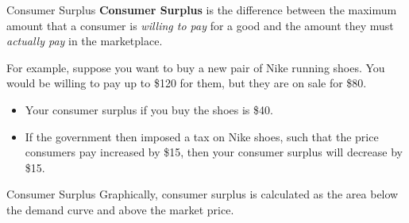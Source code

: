 \documentclass{beamer}
\begin{document}
\begin{frame}{Consumer Surplus}
  \textbf{Consumer Surplus} is the difference between the maximum amount that a consumer is \emph{willing to pay} for a good and the amount they must \emph{actually pay} in the marketplace.
  

  \bigskip
  For example, suppose you want to buy a new pair of Nike running shoes. You would be willing to pay up to \$120 for them, but they are on sale for \$80. 

  \begin{itemize}
    \item Your consumer surplus if you buy the shoes is \$40.
    
    \item If the government then imposed a tax on Nike shoes, such that the price consumers pay increased by \$15, then your consumer surplus will decrease by \$15.
  \end{itemize}
\end{frame}

\begin{frame}{Consumer Surplus}
  Graphically, consumer surplus is calculated as the area below the demand curve and above the market price.

  \begin{figure}
  \end{figure}
\end{frame}
\end{document}
